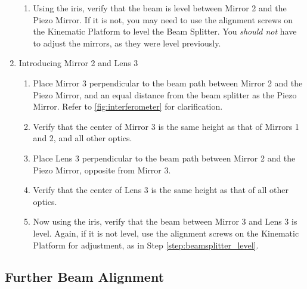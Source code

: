 \begin{enumerate}
\begin{enumerate}
        \item Using the iris, verify that the beam is level between Mirror 2 and
        the Piezo Mirror. If it is not, you may need to use the alignment screws
        on the Kinematic Platform to level the Beam Splitter. You \emph{should
        not} have to adjust the mirrors, as they were level previously.
        \label{step:beamsplitter_level}
        \end{enumerate}
    \item Introducing Mirror 2 and Lens 3
        \begin{enumerate}
        \item Place Mirror 3 perpendicular to the beam path between Mirror 2 and
        the Piezo Mirror, and an equal distance from the beam splitter as the
        Piezo Mirror. Refer to \ref{fig:interferometer} for clarification.
        \item Verify that the center of Mirror 3 is the same height as that of
        Mirrors 1 and 2, and all other optics.
        \item Place Lens 3 perpendicular to the beam path between Mirror 2 and
        the Piezo Mirror, opposite from Mirror 3. 
        \item Verify that the center of Lens 3 is the same height as that of all
        other optics.
        \item Now using the iris, verify that the beam between Mirror 3 and Lens
        3 is level. Again, if it is not level, use the alignment screws on the
        Kinematic Platform for adjustment, as in Step
        \ref{step:beamsplitter_level}.  
        \end{enumerate}
    \end{enumerate}
        
\subsection{Further Beam Alignment}
\label{sub:further}

